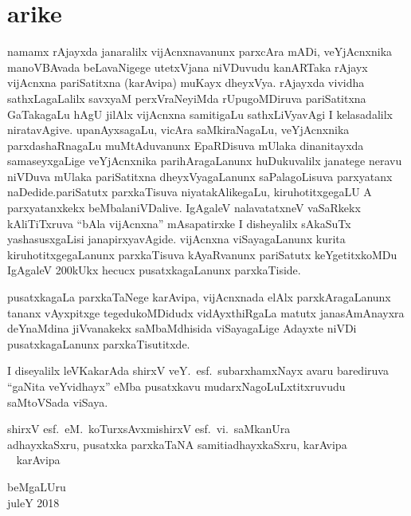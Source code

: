 \chapter*{arike}

namamx rAjayxda janaralilx vijAcnxnavanunx parxcAra mADi, veYjAcnxnika manoVBAvada beLavaNi\-gege utetxVjana niVDuvudu kanARTaka rAjayx vijAcnxna pariSatitxna (karAvipa) muKayx dheyxVya. rAjayxda vividha sathxLagaLalilx savxyaM perxVraNeyiMda rUpugoMDiruva pariSatitxna GaTaka\-gaLu hAgU jilAlx vijAcnxna samitigaLu sathxLiVyavAgi I kelasadalilx niratavAgive. upa\-nAyxsa\-gaLu, vicAra saMkiraNagaLu, veYjAcnxnika parxdashaRnagaLu muMtAduvanunx EpaRDi\-suva mUlaka dinanitayxda samaseyxgaLige veYjAcnxnika parihAragaLanunx huDukuvalilx janatege neravu niVDuva mUlaka pariSatitxna dheyxVyagaLanunx saPalagoLisuva parxyatanx naDedide.\break pariSatutx parxkaTisuva niyatakAlikegaLu, kiruhotitxgegaLU A parxyatanxkekx beMbala\break niVDalive. IgAgaleV nalavatatxneV vaSaRkekx kAliTiTxruva ``bAla vijAcnxna'' mAsapatirxke I disheyalilx sAkaSuTx yashasusxgaLisi janapirxyavAgide. vijAcnxna viSayagaLanunx \hbox{kurita} kiruhotitxgegaLanunx parxkaTisuva kAyaRvanunx pariSatutx keYgetitxkoMDu IgAgaleV {\rm 200}kUkx hecucx pusatxkagaLanunx parxkaTiside.

pusatxkagaLa parxkaTaNege karAvipa, vijAcnxnada elAlx parxkAragaLanunx tananx vAyxpitxge tegedukoMDidudx vidAyxthiRgaLa matutx janasAmAnayxra deYnaMdina jiVvanakekx saMbaMdhisida viSayagaLige Adayxte niVDi pusatxkagaLanunx parxkaTisutitxde.

I diseyalilx leVKakarAda shirxV veY.~esf.\ subarxhamxNayx avaru barediruva ``gaNita veYvidhayx'' eMba pusatxkavu mudarxNagoLuLxtitxruvudu saMtoVSada viSaya.

\bigskip
\medskip

\noindent
\quad shirxV esf.~eM.\ koTurxsAvxmi\hfill shirxV esf.~vi.\ saMkanUra\\
adhayxkaSxru, pusatxka parxkaTaNA samiti\hfill adhayxkaSxru, karAvipa~~~\\
~\phantom{AAAAA~} karAvipa

\bigskip

\noindent
beMgaLUru\\
juleY {\rm 2018}
